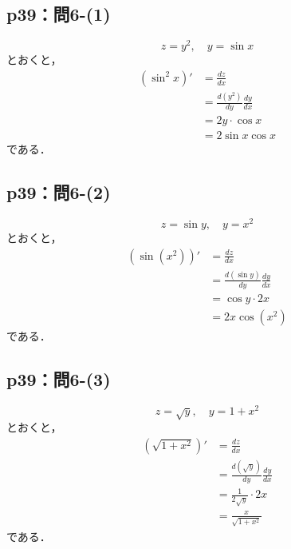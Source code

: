 \documentclass[uplatex,dvipdfmx,a4paper,10pt,fleqn]{jsarticle}
\begin{document}
\subsection*{p39：問6-(1)}

\begin{tleftbar}
    \[
        z = y^2 , \quad y = \sin x
    \]
    とおくと，
    \begin{align*} 
        (\sin ^2 x) '  &= \frac{dz}{dx} \\
        & = \frac{d (y^2)}{dy} \frac{dy}{dx}\\
        &= 2y \cdot \cos x \\
        & = 2 \sin x \cos x 
    \end{align*}
    である．
\end{tleftbar}


\subsection*{p39：問6-(2)}


\begin{tleftbar}
    \[
        z = \sin y , \quad y = x^2
    \]
    とおくと，
    \begin{align*} 
        (\sin (x^2)) '  &= \frac{dz}{dx} \\
        & = \frac{d (\sin y)}{dy} \frac{dy}{dx}\\
        &= \cos y \cdot 2x \\
        & = 2x \cos (x^2)
    \end{align*}
    である．
\end{tleftbar}


\subsection*{p39：問6-(3)}


\begin{tleftbar}
    \[
        z = \sqrt{y} , \quad y = 1+x^2
    \]
    とおくと，
    \begin{align*} 
        (\sqrt{1+x^2}) '  &= \frac{dz}{dx} \\
        & = \frac{d (\sqrt{y})}{dy} \frac{dy}{dx}\\
        &= \frac{1}{2\sqrt{y}}\cdot 2x \\
        & = \frac{x}{\sqrt{1+x^2}}
    \end{align*}
    である．
\end{tleftbar}
\end{document}
